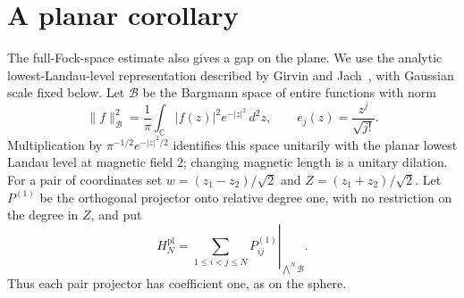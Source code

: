 \section{A planar corollary}
\label{sec:plane}

The full-Fock-space estimate also gives a gap on the plane. We use the
analytic lowest-Landau-level representation described by Girvin and
Jach~\cite[Section~II]{GirvinJach}, with Gaussian scale fixed below.
Let
$\mathcal B$ be the Bargmann space of entire functions with norm
\[
 \|f\|_{\mathcal B}^2=\frac1\pi\int_{\mathbb C}|f(z)|^2e^{-|z|^2}\,d^2z,
 \qquad e_j(z)=\frac{z^j}{\sqrt{j!}}.
\]
Multiplication by $\pi^{-1/2}e^{-|z|^2/2}$ identifies this space unitarily
with the planar lowest Landau level at magnetic field $2$; changing magnetic
length is a unitary dilation.
For a pair of coordinates set $w=(z_1-z_2)/\sqrt2$ and
$Z=(z_1+z_2)/\sqrt2$.  Let $P^{(1)}$ be the orthogonal projector onto
relative degree one, with no restriction on the degree in $Z$, and put
\[
 H_N^{\mathrm{pl}}=\left.\sum_{1\le i<j\le N}P_{ij}^{(1)}
                         \right|_{\bigwedge^N\mathcal B}.
\]
Thus each pair projector has coefficient one, as on the sphere.

